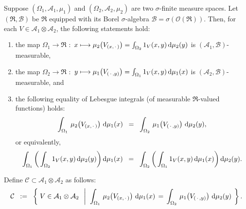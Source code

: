 \begin{theorem}
\mbox{}\vskip0.1cm\noindent
Suppose
$\left(\Omega_{1},\mathcal{A}_{1},\mu_{1}\right)$ and $\left(\Omega_{2},\mathcal{A}_{2},\mu_{2}\right)$
are two $\sigma$-finite measure spaces.
Let $\left(\Re,\mathcal{B}\right)$ be $\Re$ equipped with its Borel $\sigma$-algebra
$\mathcal{B} = \sigma\!\left(\mathcal{O}(\Re)\right)$.
Then, for each $V \in \mathcal{A}_{1} \otimes \mathcal{A}_{2}$, the following statements hold:
\begin{enumerate}
\item	the map\;
		$\Omega_{1} \longrightarrow \Re$ $:$
		$x \longmapsto \mu_{2}\!\left(V_{(x,\,\cdot\,)}\right) = \int_{\Omega_{2}}1_{V}(x,y)\,\textnormal{d}\mu_{2}(y)$
		\;is $(\mathcal{A}_{1},\mathcal{B})$-measurable,
\item	the map\;
		$\Omega_{2} \longrightarrow \Re$ $:$
		$y \longmapsto \mu_{1}\!\left(V_{(\,\cdot\,,y)}\right) = \int_{\Omega_{1}}1_{V}(x,y)\,\textnormal{d}\mu_{1}(x)$
		\;is $(\mathcal{A}_{2},\mathcal{B})$-measurable, and
\item	the following equality of Lebesgue integrals (of measurable $\Re$-valued functions) holds:
		\begin{equation*}
		\int_{\Omega_{1}}\, \mu_{2}\!\left(V_{(x,\,\cdot\,)}\right) \,\textnormal{d}\mu_{1}(x)
		\;\; = \;\;
		\int_{\Omega_{2}}\, \mu_{1}\!\left(V_{(\,\cdot\,,y)}\right) \,\textnormal{d}\mu_{2}(y),
		\end{equation*}
		or equivalently,
		\begin{equation*}
		\int_{\Omega_{1}} \left(\, \int_{\Omega_{2}} 1_{V}(x,y) \,\textnormal{d}\mu_{2}(y) \right) \textnormal{d}\mu_{1}(x)
		\;\; = \;\;
		\int_{\Omega_{2}} \left(\, \int_{\Omega_{1}} 1_{V}(x,y) \,\textnormal{d}\mu_{1}(x) \right) \textnormal{d}\mu_{2}(y).
		\end{equation*}
\end{enumerate}
\end{theorem}
\proof
Define $\mathcal{C} \subset \mathcal{A}_{1}\otimes\mathcal{A}_{2}$ as follows:
\begin{equation*}
\mathcal{C}
\;\; := \;\;
	\left\{\;
	V \in \mathcal{A}_{1}\otimes\mathcal{A}_{2}
	\;\;\left\vert\;\;
		\int_{\Omega_{1}}\, \mu_{2}\!\left(V_{(x,\,\cdot\,)}\right) \,\textnormal{d}\mu_{1}(x)
		\, = \,
		\int_{\Omega_{2}}\, \mu_{1}\!\left(V_{(\,\cdot\,,y)}\right) \,\textnormal{d}\mu_{2}(y)
	\right.
	\;\right\}.
\end{equation*}
\vskip 0.5cm

